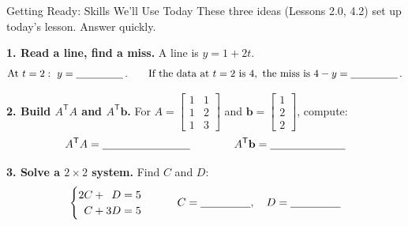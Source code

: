 \documentclass[10pt]{article}
\newcommand{\bb}{\mathbf{b}}
\newcommand{\T}{\mathsf{T}}
\begin{document}
\namedateperiod

\vspace{0.12in}

\begin{notesbox}{Getting Ready: Skills We'll Use Today}
\small These three ideas (Lessons 2.0, 4.2) set up today's lesson. Answer quickly.

\vspace{4pt}
\textbf{1. Read a line, find a miss.} A line is $y=1+2t$.
\[
  \text{At } t=2:\ y=\blank{1.6cm}\,. \qquad
  \text{If the data at } t=2 \text{ is } 4,\ \text{the miss is } 4-y=\blank{1.6cm}\,.
\]

\vspace{4pt}
\textbf{2. Build $A^{\T}A$ and $A^{\T}\bb$.} For $A=\begin{bmatrix} 1 & 1\\ 1 & 2\\ 1 & 3 \end{bmatrix}$ and
$\bb=\begin{bmatrix} 1\\ 2\\ 2 \end{bmatrix}$, compute:
\[
  A^{\T}A = \blank{2.8cm} \qquad\qquad A^{\T}\bb = \blank{2.4cm}
\]

\vspace{4pt}
\textbf{3. Solve a $2\times2$ system.} Find $C$ and $D$:
\[
  \begin{cases} 2C + \phantom{1}D = 5 \\ \phantom{2}C + 3D = 5 \end{cases}
  \qquad C = \blank{1.6cm},\quad D = \blank{1.6cm}
\]
\end{notesbox}
\end{document}
